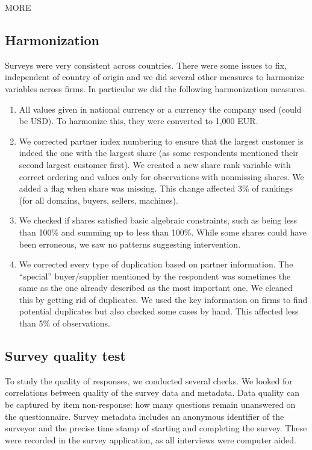 \documentclass[final, dvipsnames, authoryear,12pt]{elsarticle}
\begin{document}
MORE


\subsection{Harmonization} 

Surveys were very consistent across countries. There were some issues to fix, independent of country of origin and we did several other measures to harmonize variables across firms. In particular we did the following harmonization measures.

\begin{enumerate}
    \item All values given in national currency or a currency the company used (could be USD). To harmonize this, they were converted to 1,000 EUR. 
    
    \item We corrected partner index numbering to ensure that the largest customer is indeed the one with the largest share (as some respondents mentioned their second largest customer first). We created a new share rank variable with correct ordering and values only for observations with nonmissing shares. We added a flag when share was missing. This change affected 3\% of rankings (for all domains, buyers, sellers, machines). 
    
    \item We checked if shares satisfied basic algebraic constraints, such as being less than 100\% and summing up to less than 100\%. While some shares could have been erroneous, we saw no patterns suggesting intervention.
    
    \item We corrected every type of duplication based on partner information. The ``special'' buyer/supplier mentioned by the respondent was sometimes the same as the one already described as the most important one. We cleaned this by getting rid of duplicates. We used the key information on firms to find potential duplicates but also checked some cases by hand. This affected less than 5\% of observations.

\end{enumerate}

\subsection{Survey quality test}
To study the quality of responses, we conducted several checks. We looked for correlations between quality of the survey data and metadata. Data quality can be captured by item non-response: how many questions remain unanswered on the questionnaire. Survey metadata includes an anonymous identifier of the surveyor and the precise time stamp of starting and completing the survey. These were recorded in the survey application, as all interviews were computer aided. 
\end{document}
